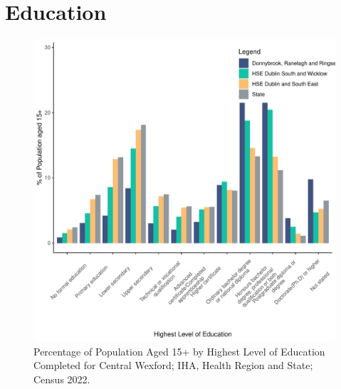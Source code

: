 \documentclass{article}
\begin{document}
\section{Education}\label{sect:Edu}
\begin{figure}[H]
	\centering
	\includegraphics[width = 120mm]{../figures/EduED.pdf}
	\caption{Percentage of Population Aged 15+ by Highest Level of Education Completed for Central Wexford; IHA, Health Region and State; Census 2022.}
	\label{fig:vbnv}
	\end{figure}
\end{document}
